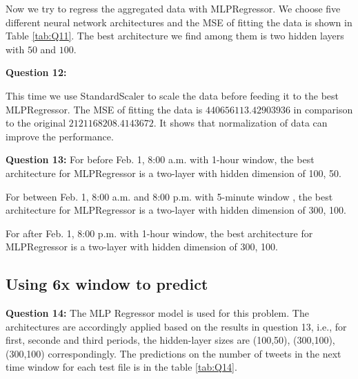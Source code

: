 \documentclass{article}
\begin{document}
Now we try to regress the aggregated data with MLPRegressor. We choose five different neural network architectures and the MSE of fitting the data is shown in Table \ref{tab:Q11}. The best architecture we find among them is two hidden layers with $50$ and $100$.

\begin{table}[h]
\center
\caption{MSE of different architectures}
\label{tab:Q11}
\end{table}



\bigbreak
\textbf{Question 12:}

This time we use StandardScaler to scale the data before feeding it to the best MLPRegressor. The MSE of fitting the data is $440656113.42903936$ in comparison to the original $2121168208.4143672$. It shows that normalization of data can improve the performance.




\bigbreak
\textbf{Question 13:}
For before Feb. 1, 8:00 a.m. with 1-hour window, the best architecture for MLPRegressor is a two-layer with hidden dimension of 100, 50.

For between Feb. 1, 8:00 a.m. and 8:00 p.m. with 5-minute window , the best architecture for MLPRegressor is a two-layer with hidden dimension of 300, 100.

For after Feb. 1, 8:00 p.m. with 1-hour window, the best architecture for MLPRegressor is a two-layer with hidden dimension of 300, 100.



\bigbreak
\subsection{Using 6x window to predict}
\textbf{Question 14:}
The MLP Regressor model is used for this problem. The architectures are accordingly applied based on the results in question 13, i.e., for first, seconde and third periods, the hidden-layer sizes are (100,50), (300,100), (300,100) correspondingly. The predictions on the number of tweets in the next time window for each test file is in the table \ref{tab:Q14}.
\end{document}
